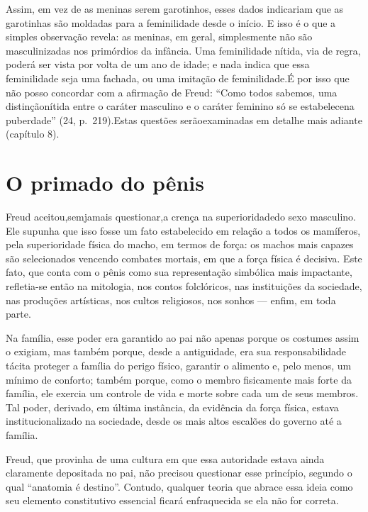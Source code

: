  Assim, em vez de as meninas serem garotinhos, esses dados indicariam
que as garotinhas são moldadas para a feminilidade desde o início. E
isso é o que a simples observação revela: as meninas, em geral,
simplesmente não são masculinizadas nos primórdios da infância. Uma
feminilidade nítida, via de regra, poderá ser vista por volta de um ano
de idade; e nada indica que essa feminilidade seja uma fachada, ou uma
imitação de feminilidade.\idxfeminsimb[|)] É por isso que não posso concordar com a
afirmação de Freud: ``Como todos sabemos, uma distinção\idxrelpciden[|)]
nítida entre o caráter masculino e o caráter feminino só se estabelece\idxidenedi[|)]
na puberdade'' (24, p.~219).\idxconfe[|)] Estas questões serão\idxfeminconf[|)]
examinadas em detalhe mais adiante (capítulo 8).


\section{O primado do pênis}

Freud aceitou,\idxfreudsuper[|(] sem\idxpenisprim[|(] jamais questionar,\idxmascsu[|(] a crença na superioridade\idxcondfinfe[|(] do sexo
masculino. Ele supunha que isso fosse um fato estabelecido em relação a
todos os mamíferos, pela superioridade física do macho, em termos de
força: os machos mais capazes são selecionados vencendo combates
mortais, em que a força física é decisiva. Este fato, que conta com o
pênis como sua representação simbólica mais impactante, refletia-se
então na mitologia, nos contos folclóricos, nas instituições da
sociedade, nas produções artísticas, nos cultos religiosos, nos sonhos
--- enfim, em toda parte.

 Na família, esse poder era garantido ao pai não apenas porque os
costumes assim o exigiam, mas também porque, desde a antiguidade, era
sua responsabilidade tácita proteger a família do perigo físico,
garantir o alimento e, pelo menos, um mínimo de conforto; também
porque, como o membro fisicamente mais forte da família, ele exercia um
controle de vida e morte sobre cada um de seus membros. Tal poder,
derivado, em última instância, da evidência da força física,\idxpaisauto{} estava
institucionalizado na sociedade, desde os mais altos escalões do
governo até a família.

 Freud,\idxfreudident{} que provinha de uma cultura em que essa autoridade estava ainda
claramente depositada no pai, não precisou questionar esse princípio,
segundo o qual ``anatomia é destino''.
Contudo, qualquer teoria que abrace essa ideia como seu elemento
constitutivo essencial ficará enfraquecida se ela não for correta.

